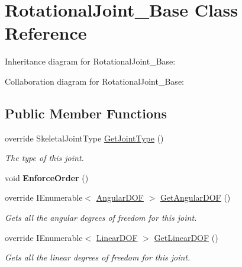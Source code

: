 \hypertarget{class_rotational_joint___base}{}\section{Rotational\+Joint\+\_\+\+Base Class Reference}
\label{class_rotational_joint___base}


Inheritance diagram for Rotational\+Joint\+\_\+\+Base\+:


Collaboration diagram for Rotational\+Joint\+\_\+\+Base\+:
\subsection*{Public Member Functions}
\begin{DoxyCompactItemize}
\item 
override Skeletal\+Joint\+Type \hyperlink{class_rotational_joint___base_a58b8ae858b3f342302b5a28412ecac6b}{Get\+Joint\+Type} ()
\begin{DoxyCompactList}\small\item\em The type of this joint. \end{DoxyCompactList}\item 
\mbox{\label{class_rotational_joint___base_abb72f04b9e993b3da54353a81ef0b2ef}} 
void {\bfseries Enforce\+Order} ()
\item 
override I\+Enumerable$<$ \hyperlink{interface_angular_d_o_f}{Angular\+D\+OF} $>$ \hyperlink{class_rotational_joint___base_aead83dd768acf451c3761f49e393cc35}{Get\+Angular\+D\+OF} ()
\begin{DoxyCompactList}\small\item\em Gets all the angular degrees of freedom for this joint. \end{DoxyCompactList}\item 
override I\+Enumerable$<$ \hyperlink{interface_linear_d_o_f}{Linear\+D\+OF} $>$ \hyperlink{class_rotational_joint___base_a887b07a072831dd6af60ded53e3a461e}{Get\+Linear\+D\+OF} ()
\begin{DoxyCompactList}\small\item\em Gets all the linear degrees of freedom for this joint. \end{DoxyCompactList}\end{DoxyCompactItemize}
